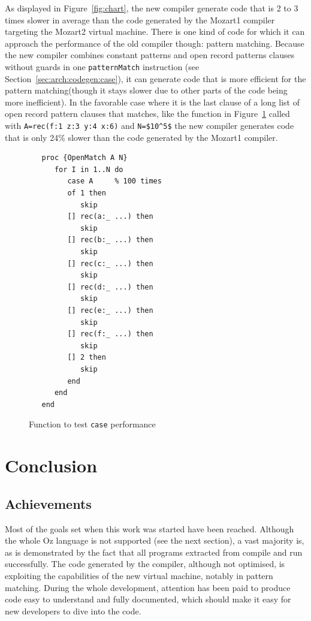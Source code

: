 \documentclass[a4paper]{memoir}
\begin{document}
As displayed in Figure~\ref{fig:chart}, the new compiler generate code that is 2 to 3 times slower in average than the code generated by the Mozart1 compiler targeting the Mozart2 virtual machine. There is one kind of code
for which it can approach the performance of the old compiler though: pattern
matching. Because the new compiler combines constant patterns and open record
patterns clauses without guards in one \lstinline!patternMatch! instruction (see
Section~\ref{sec:arch:codegen:case}), it can generate code that
is more efficient for the pattern matching(though it stays slower due to other parts of the code being more
inefficient).
In the favorable case where it is the last clause of a long list of open record
pattern clauses that matches, like the function in
Figure~\ref{fig:perf:openmatch} called with \lstinline!A=rec(f:1 z:3 y:4 x:6)!
and \lstinline!N=$10^5$! the new compiler generates code that is only 24\% slower than the
code generated by the Mozart1 compiler.


\begin{figure}[h]
\begin{lstlisting}
   proc {OpenMatch A N}
      for I in 1..N do
         case A     % 100 times
         of 1 then
            skip
         [] rec(a:_ ...) then
            skip
         [] rec(b:_ ...) then
            skip
         [] rec(c:_ ...) then
            skip
         [] rec(d:_ ...) then
            skip
         [] rec(e:_ ...) then
            skip
         [] rec(f:_ ...) then
            skip
         [] 2 then
            skip
         end
      end
   end
\end{lstlisting}
\caption{Function to test \lstinline!case! performance}
\label{fig:perf:openmatch}
\end{figure}


\chapter{Conclusion}
\section{Achievements}
Most of the goals set when this work was started have been reached.
Although the whole Oz language is not supported (see the next section), a vast majority is, as is demonstrated by the fact that all programs extracted from \cite{CTMCP} compile and run successfully. The code generated by the compiler, although not optimised, is exploiting the capabilities of the new virtual machine, notably in pattern matching.  During the whole development, attention has been paid to produce code easy to understand and fully documented, which should make it easy for new developers to dive into the code.
\end{document}
